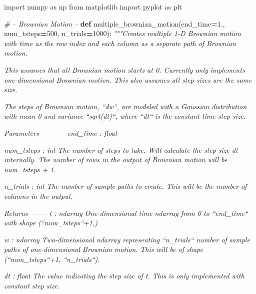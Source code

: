 \documentclass[]{article}
\newenvironment{Shaded}{\begin{snugshade}}{\end{snugshade}}
\newcommand{\CommentTok}[1]{\textcolor[rgb]{0.56,0.35,0.01}{\textit{#1}}}
\newcommand{\DecValTok}[1]{\textcolor[rgb]{0.00,0.00,0.81}{#1}}
\newcommand{\FloatTok}[1]{\textcolor[rgb]{0.00,0.00,0.81}{#1}}
\newcommand{\ImportTok}[1]{#1}
\newcommand{\KeywordTok}[1]{\textcolor[rgb]{0.13,0.29,0.53}{\textbf{#1}}}
\newcommand{\NormalTok}[1]{#1}
\newcommand{\OperatorTok}[1]{\textcolor[rgb]{0.81,0.36,0.00}{\textbf{#1}}}
\begin{document}
\begin{Shaded}
\begin{Highlighting}[]
\ImportTok{import}\NormalTok{ numpy }\ImportTok{as}\NormalTok{ np}
\ImportTok{from}\NormalTok{ matplotlib }\ImportTok{import}\NormalTok{ pyplot }\ImportTok{as}\NormalTok{ plt}

\CommentTok{# -- Brownian Motion --}
\KeywordTok{def}\NormalTok{ multiple_brownian_motion(end_time}\OperatorTok{=}\FloatTok{1.}\NormalTok{, num_tsteps}\OperatorTok{=}\DecValTok{500}\NormalTok{, n_trials}\OperatorTok{=}\DecValTok{1000}\NormalTok{):}
    \CommentTok{"""Creates multiple 1-D Brownian motion with time as the row index and}
\CommentTok{    each column as a separate path of Brownian motion.}

\CommentTok{    This assumes that all Brownian motion starts at 0. Currently only}
\CommentTok{    implements one-dimensional Brownian motion. This also assumes all}
\CommentTok{    step sizes are the same size.}

\CommentTok{    The steps of Brownian motion, ``dw``, are modeled with a Gaussian}
\CommentTok{    distribution with mean 0 and variance ``sqrt(dt)``, where ``dt``}
\CommentTok{    is the constant time step size.}

\CommentTok{    Parameters}
\CommentTok{    ----------}
\CommentTok{    end_time : float}

\CommentTok{    num_tsteps : int}
\CommentTok{        The number of steps to take. Will calculate the step}
\CommentTok{        size dt internally. The number of rows in the output of}
\CommentTok{        Brownian motion will be num_tsteps + 1.}

\CommentTok{    n_trials : int}
\CommentTok{        The number of sample paths to create. This will be the number}
\CommentTok{        of columns in the output.}

\CommentTok{    Returns}
\CommentTok{    -------}
\CommentTok{    t : ndarray}
\CommentTok{        One-dimensional time ndarray from 0 to ``end_time`` with}
\CommentTok{        shape (``num_tsteps``+1,)}

\CommentTok{    w : ndarray}
\CommentTok{        Two-dimensional ndarray representing ``n_trials`` number of}
\CommentTok{        sample paths of one-dimensional Brownian motion.}
\CommentTok{        This will be of shape (``num_tsteps``+1, ``n_trials``).}

\CommentTok{    dt : float}
\CommentTok{        The value indicating the step size of t. This is only implemented}
\CommentTok{        with constant step size.}


\end{Highlighting}
\end{Shaded}
\end{document}
